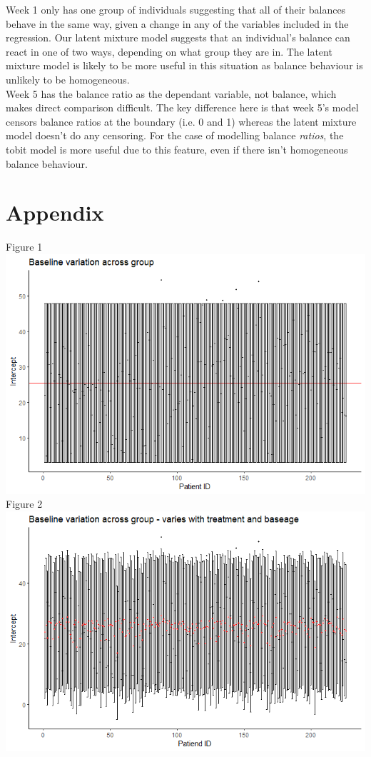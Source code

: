 \documentclass[12pt]{article}
\begin{document}
{Week 1 only has one group of individuals suggesting that all of their balances behave in the same way, given a change in any of the variables included in the regression. Our latent mixture model suggests that an individual's balance can react in one of two ways, depending on what group they are in. The latent mixture model is likely to be more useful in this situation as balance behaviour is unlikely to be homogeneous.\\

Week 5 has the balance ratio as the dependant variable, not balance, which makes direct comparison difficult. The key difference here is that week 5's model censors balance ratios at the boundary (i.e. 0 and 1) whereas the latent mixture model doesn't do any censoring. For the case of modelling balance \textit{ratios}, the tobit model is more useful due to this feature, even if there isn't homogeneous balance behaviour.\\






\section*{Appendix}
Figure 1\\
\includegraphics[scale=0.6]{Q1}\\
Figure 2\\
\includegraphics[scale=0.6]{Q2}\\



}
\end{document}
